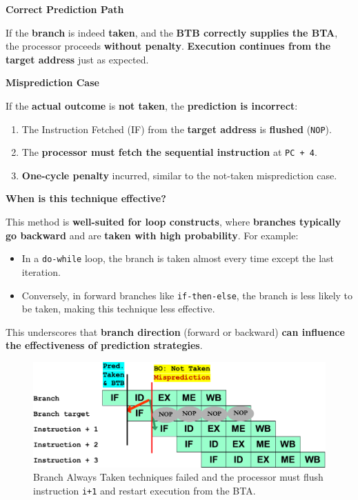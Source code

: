 \highspace
\begin{flushleft}
    \textcolor{Green3}{ \textbf{Correct Prediction Path}}
\end{flushleft}
If the \textbf{branch} is indeed \textbf{taken}, and the \textbf{BTB correctly supplies the BTA}, the processor proceeds \textbf{without penalty}. \textbf{Execution continues from the target address} just as expected.

\highspace
\begin{flushleft}
    \textcolor{Red2}{ \textbf{Misprediction Case}}
\end{flushleft}
If the \textbf{actual outcome} is \textbf{not taken}, the \textbf{prediction is incorrect}:
\begin{enumerate}
    \item The Instruction Fetched (IF) from the \textbf{target address} is \textbf{flushed} (\texttt{NOP}).
    \item The \textbf{processor must fetch the sequential instruction} at \texttt{PC + 4}.
    \item \textcolor{Red2}{\textbf{One-cycle penalty}} incurred, similar to the not-taken misprediction case.
\end{enumerate}

\highspace
\begin{flushleft}
    \textcolor{Green3}{\faIcon{\speedIcon} \textbf{When is this technique effective?}}
\end{flushleft}
This method is \textbf{well-suited for loop constructs}, where \textbf{branches typically go backward} and are \textbf{taken with high probability}. For example:
\begin{itemize}
    \item In a \texttt{do-while} loop, the branch is taken almost every time except the last iteration.
    \item Conversely, in forward branches like \texttt{if-then-else}, the branch is less likely to be taken, making this technique less effective.
\end{itemize}
This underscores that \textbf{branch direction} (forward or backward) \textbf{can influence the effectiveness of prediction strategies}.

\newpage

\begin{figure}[!htp]
    \centering
    \includegraphics[width=\textwidth]{img/branch-always-taken.pdf}
    \caption{Branch Always Taken techniques failed and the processor must flush instruction \texttt{i+1} and restart execution from the BTA.}
\end{figure}